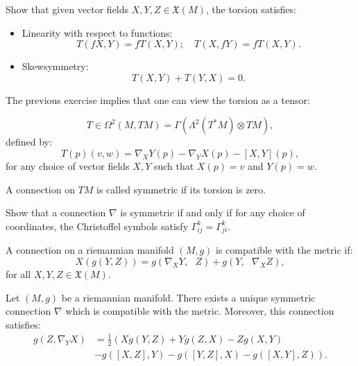 \begin{exercise} Show that given vector fields $X,Y,Z\in\mathfrak{X}(M) $, the
	torsion satisfies:
	
	\begin{itemize}
		\item Linearity with respect to functions: \[T(fX,Y)=fT(X,Y);\quad
		T(X,fY)=fT(X,Y).\]
		
		\item Skewsymmetry: \[T\left(  X,Y\right)  +T\left(  Y,X\right)  =0.\]
	\end{itemize}
	
\end{exercise}


The previous exercise implies that one can view the torsion as a tensor:

\[
T\in\Omega^{2}(M,TM)=\Gamma(\Lambda^{2}(T^{\ast}M)\otimes TM),
\]
defined by:
\[
T(p)(v,w)=\nabla_{X}Y(p)-\nabla_{Y}X(p)-[X,Y](p),
\]
for any choice of vector fields $X,Y$ such that $X(p)=v$ and $Y(p)=w$.

\begin{definition}
	A connection on $TM$ is called symmetric if its torsion is zero.
\end{definition}

\begin{exercise}
	Show that a connection $\nabla$ is symmetric if and only if for any choice of
	coordinates, the Christoffel symbols satisfy $\Gamma_{ij}^{k}=\Gamma_{ji}%
	^{k}.$
\end{exercise}

\begin{definition}
	A connection on a riemannian manifold $\left(  M,g\right)  $ is
	compatible with the metric if:
	\[
	{X}(g(Y,Z))=g\left(  \nabla_{X}Y,\text{ }Z\right)  +g\left(  Y,\text{ }%
	\nabla_{X}Z\right)  ,
	\]
	for all $X,Y,Z\in\mathfrak{X}(M).$
\end{definition}

\begin{theorem}
	\label{4Teo3}Let $\left(  M,g\right)  $ be a riemannian
	manifold. There exists a unique symmetric connection $\nabla$ which is
	compatible with the metric. Moreover, this connection satisfies:
	\begin{align}
	g\left(  Z,\nabla_{Y}X\right)   &  =\frac{1}{2}\left(  Xg\left(  Y,Z\right)
	+Yg\left(  Z,X\right)  -Zg\left(  X,Y\right)  \right. \nonumber\\
	&  \left.  -g\left(  \left[  X,Z\right]  ,Y\right)  -g\left(  \left[
	Y,Z\right]  ,X\right)  -g\left(  \left[  X,Y\right]  ,Z\right)  \right)  .
	\label{4ec9}%
	\end{align}
	
\end{theorem}

